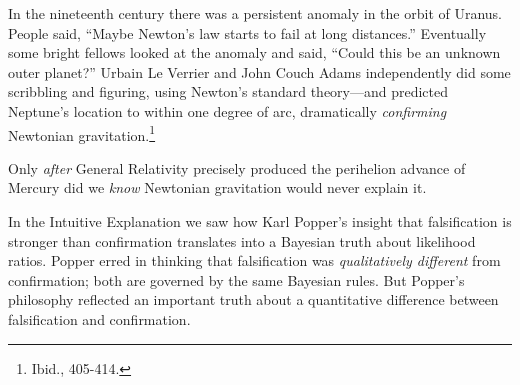 {
 In the nineteenth century there was a persistent anomaly in the
orbit of Uranus. People said, ``Maybe
Newton's law starts to fail at long
distances.'' Eventually some bright fellows looked at
the anomaly and said, ``Could this be an unknown outer
planet?'' Urbain Le Verrier and John Couch Adams
independently did some scribbling and figuring, using
Newton's standard theory---and predicted
Neptune's location to within one degree of arc,
dramatically \textit{confirming} Newtonian
gravitation.\footnote{Ibid., 405-414.}}

{
 Only \textit{after} General Relativity precisely produced the
perihelion advance of Mercury did we \textit{know} Newtonian
gravitation would never explain it.}

\hr

{
 In the Intuitive Explanation we saw how Karl
Popper's insight that falsification is stronger than
confirmation translates into a Bayesian truth about likelihood ratios.
Popper erred in thinking that falsification was \textit{qualitatively
different} from confirmation; both are governed by the same Bayesian
rules. But Popper's philosophy reflected an important
truth about a quantitative difference between falsification and
confirmation.}

